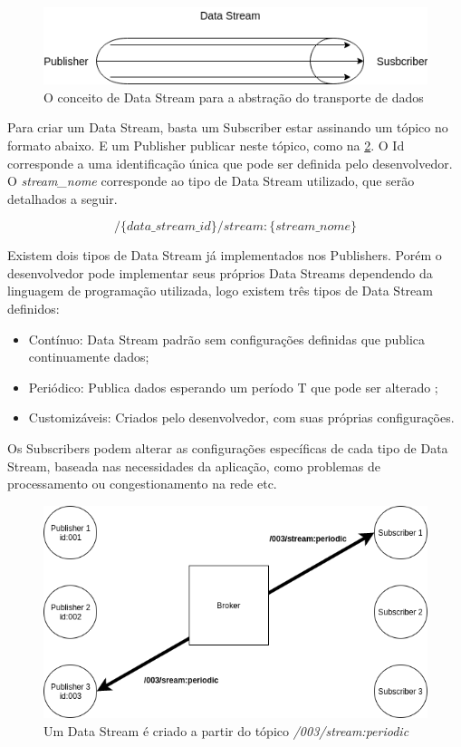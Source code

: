 \begin{figure}[h!]
\centering
\includegraphics[width=13cm]{./02_Capitulos/02_Cap3/figures/data_stream}
\caption{O conceito de Data Stream para a abstração do transporte de dados}
\label{fig:3.1.0/data_stream}
\end{figure}

Para criar um Data Stream, basta um Subscriber estar assinando um tópico no formato abaixo. E um Publisher publicar neste tópico, como na \ref{fig:3.1.0/data_stream_creation}. O Id corresponde a uma identificação única que pode ser definida pelo desenvolvedor. O \textit{stream\_nome} corresponde ao tipo de Data Stream utilizado, que serão detalhados a seguir.

$$ /\{data\_stream\_id\}/stream:\{stream\_nome\} $$

Existem dois tipos de Data Stream já implementados nos Publishers. Porém o desenvolvedor pode implementar seus próprios Data Streams dependendo da linguagem de programação utilizada, logo existem três tipos de Data Stream definidos:

\begin{itemize}
\item Contínuo: Data Stream padrão sem configurações definidas que publica continuamente dados;
\item Periódico: Publica dados esperando um período T que pode ser alterado ;
\item Customizáveis: Criados pelo desenvolvedor, com suas próprias configurações.
\end{itemize}

Os Subscribers podem alterar as configurações específicas de cada tipo de Data Stream, baseada nas necessidades da aplicação, como problemas de processamento ou congestionamento na rede etc.

\begin{figure}[h!]
\centering
\includegraphics[width=13cm]{./02_Capitulos/02_Cap3/figures/data_stream_creation}
\caption{Um Data Stream é criado a partir do tópico \textit{/003/stream:periodic}}
\label{fig:3.1.0/data_stream_creation}
\end{figure}


